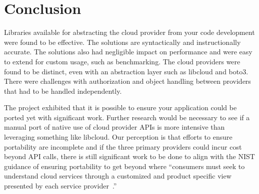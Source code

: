 \section{Conclusion}

Libraries available for abstracting the cloud provider from your code
development were found to be effective. The solutions are syntactically and
instructionally accurate. The solutions also had negligible impact on
performance and were easy to extend for custom usage, such as benchmarking.
The cloud providers were found to be distinct, even with an abstraction layer
such as libcloud and boto3. There were challenges with authorization and object
handling between providers that had to be handled independently. 

The project exhibited that it is possible to ensure your application could be
ported yet with significant work. Further research would be necessary to see if
a manual port of native use of cloud provider APIs is more intensive than
leveraging something like libcloud. Our perception is that efforts to ensure
portability are incomplete and if the three primary providers could incur cost
beyond API calls, there is still significant work to be done to align with the
NIST guidance of ensuring portability to get beyond where ``consumers must seek
to understand cloud services through a customized and product specific view
presented by each service provider~\cite{hid-sp18-518-NIST-293}.''

